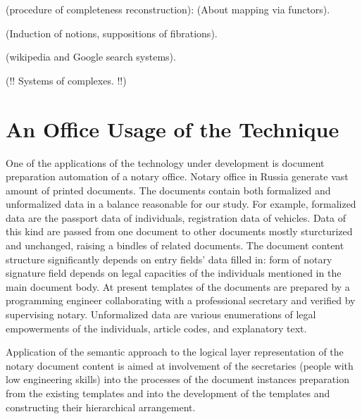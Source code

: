 \documentclass[conference]{IEEEtran}
\begin{document}
(procedure of completeness reconstruction): (About mapping via functors).

(Induction of notions, suppositions of fibrations).

(wikipedia and Google search systems).

(!! Systems of complexes. !!)

\section{An Office Usage of the Technique}

One of the applications of the technology under development is document preparation automation of a notary office. Notary office in Russia generate vast amount of printed documents. The documents contain both formalized and unformalized data in a balance reasonable for our study. For example, formalized data are the passport data of individuals, registration data of vehicles. Data of this kind are passed from one document to other documents mostly sturcturized and unchanged, raising a bindles of related documents. The document content structure significantly depends on entry fields’ data filled in: form of notary signature field depends on legal capacities of the individuals mentioned in the main document body. At present templates of the documents are prepared by a programming engineer collaborating with a professional secretary and verified by supervising notary. Unformalized data are various enumerations of legal empowerments of the individuals, article codes, and explanatory text.

Application of the semantic approach to the logical layer representation of the notary document content is aimed at involvement of the secretaries (people with low engineering skills) into the processes of the document instances preparation from the existing templates and into the development of the templates and constructing their hierarchical arrangement.
\end{document}
